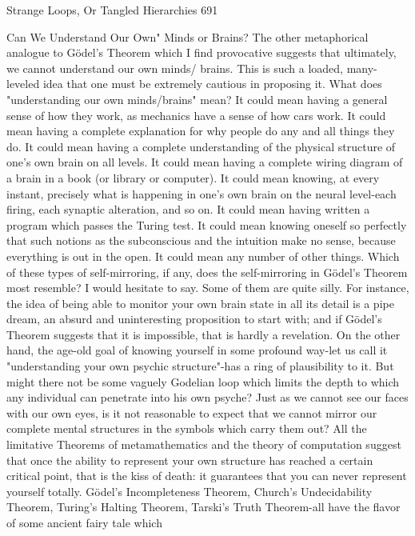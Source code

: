 Strange Loops, Or Tangled Hierarchies                                                     691

              Can We Understand Our Own" Minds or Brains?
The other metaphorical analogue to Gödel’s Theorem which I find provocative suggests
that ultimately, we cannot understand our own minds/ brains. This is such a loaded,
many-leveled idea that one must be extremely cautious in proposing it. What does
"understanding our own minds/brains" mean? It could mean having a general sense of
how they work, as mechanics have a sense of how cars work. It could mean having a
complete explanation for why people do any and all things they do. It could mean having
a complete understanding of the physical structure of one's own brain on all levels. It
could mean having a complete wiring diagram of a brain in a book (or library or
computer). It could mean knowing, at every instant, precisely what is happening in one's
own brain on the neural level-each firing, each synaptic alteration, and so on. It could
mean having written a program which passes the Turing test. It could mean knowing
oneself so perfectly that such notions as the subconscious and the intuition make no
sense, because everything is out in the open. It could mean any number of other things.
        Which of these types of self-mirroring, if any, does the self-mirroring in Gödel’s
Theorem most resemble? I would hesitate to say. Some of them are quite silly. For
instance, the idea of being able to monitor your own brain state in all its detail is a pipe
dream, an absurd and uninteresting proposition to start with; and if Gödel’s Theorem
suggests that it is impossible, that is hardly a revelation. On the other hand, the age-old
goal of knowing yourself in some profound way-let us call it "understanding your own
psychic structure"-has a ring of plausibility to it. But might there not be some vaguely
Godelian loop which limits the depth to which any individual can penetrate into his own
psyche? Just as we cannot see our faces with our own eyes, is it not reasonable to expect
that we cannot mirror our complete mental structures in the symbols which carry them
out?
        All the limitative Theorems of metamathematics and the theory of computation
suggest that once the ability to represent your own structure has reached a certain critical
point, that is the kiss of death: it guarantees that you can never represent yourself totally.
Gödel’s Incompleteness Theorem, Church's Undecidability Theorem, Turing's Halting
Theorem, Tarski's Truth Theorem-all have the flavor of some ancient fairy tale which
